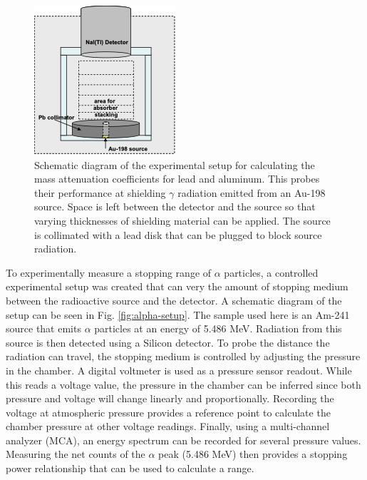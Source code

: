 \begin{figure}
\centering
\includegraphics[scale=0.5]{gamma_setup.png}
\caption{Schematic diagram of the experimental setup for calculating the mass attenuation coefficients for lead and aluminum. This probes their performance at shielding $\gamma$ radiation emitted from an Au-198 source. Space is left between the detector and the source so that varying thicknesses of shielding material can be applied. The source is collimated with a lead disk that can be plugged to block source radiation.}
\label{fig:gamma-setup}
\end{figure}

To experimentally measure a stopping range of $\alpha$ particles, a controlled experimental setup was created that can very the amount of stopping medium between the radioactive source and the detector. A schematic diagram of the setup can be seen in Fig. \ref{fig:alpha-setup}. The sample used here is an Am-241 source that emits $\alpha$ particles at an energy of 5.486 MeV. Radiation from this source is then detected using a Silicon detector. To probe the distance the radiation can travel, the stopping medium is controlled by adjusting the pressure in the chamber. A digital voltmeter is used as a pressure sensor readout. While this reads a voltage value, the pressure in the chamber can be inferred since both pressure and voltage will change linearly and proportionally. Recording the voltage at atmospheric pressure provides a reference point to calculate the chamber pressure at other voltage readings. Finally, using a multi-channel analyzer (MCA), an energy spectrum can be recorded for several pressure values. Measuring the net counts of the $\alpha$ peak (5.486 MeV) then provides a stopping power relationship that can be used to calculate a range.

